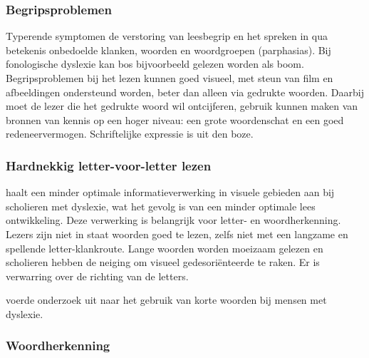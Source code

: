 
\subsubsection{Begripsproblemen}


Typerende symptomen de verstoring van leesbegrip en het spreken in qua betekenis onbedoelde klanken, woorden en woordgroepen (parphasias). Bij fonologische dyslexie kan bos bijvoorbeeld gelezen worden als boom. Begripsproblemen bij het lezen kunnen goed visueel, met steun van film en afbeeldingen ondersteund worden, beter dan alleen via gedrukte woorden. Daarbij moet de lezer die het gedrukte woord wil ontcijferen, gebruik kunnen maken van bronnen van kennis op een hoger niveau: een grote woordenschat en een goed redeneervermogen. Schriftelijke expressie is uit den boze.

\subsubsection{Hardnekkig letter-voor-letter lezen}

\textcite{Bonte2020} haalt een minder optimale informatieverwerking in visuele gebieden aan bij scholieren met dyslexie, wat het gevolg is van een minder optimale lees ontwikkeling. Deze verwerking is belangrijk voor letter- en woordherkenning. Lezers zijn niet in staat woorden goed te lezen, zelfs niet met een langzame en spellende letter-klankroute. Lange woorden worden moeizaam gelezen en scholieren hebben de neiging om visueel gedesoriënteerde te raken. Er is verwarring over de richting van de letters.

\textcite{Rello2013} voerde onderzoek uit naar het gebruik van korte woorden bij mensen met dyslexie.

\subsubsection{Woordherkenning}







